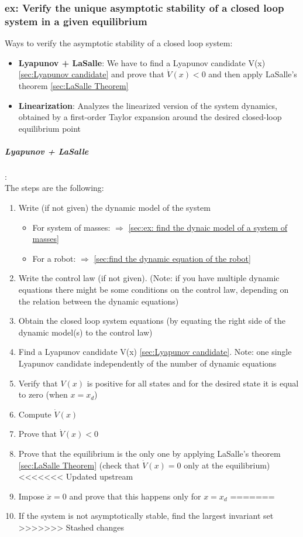 \documentclass[a4paper,12pt]{article}
\begin{document}
\subsubsection{ex: Verify the unique asymptotic stability of a closed loop
system in a given equilibrium}
Ways to verify the asymptotic stability of a
closed loop system:
\begin{itemize}
    \item \textbf{Lyapunov + LaSalle}: We have to find a Lyapunov
    candidate V(x) \ref{sec:Lyapunov candidate} and prove that $\dot{V}(x) < 0$ and then apply
    LaSalle's theorem \ref{sec:LaSalle Theorem}
    \item \textbf{Linearization}: Analyzes the linearized version of the system
    dynamics, obtained by a first-order Taylor expansion around the desired closed-loop equilibrium
    point
\end{itemize}
\subparagraph{Lyapunov + LaSalle}:\\
\label{sub:Lyapunov + LaSalle}
The steps are the following:
\begin{enumerate}
    \item Write (if not given) the dynamic model of the system 
    \begin{itemize}
        \item For system of masses: $\Rightarrow$ \ref{sec:ex: find the dynaic model of a system of masses}
        \item For a robot: $\Rightarrow$ \ref{sec:find the dynamic equation of the robot}
    \end{itemize}
    \item Write the control law (if not given). (Note: if you have multiple
    dynamic equations there might be some conditions on the control law, depending
    on the relation between the dynamic equations)
    \item Obtain the closed loop system equations (by 
    equating the right side of the dynamic model(s) to the control law)
    \item Find a Lyapunov candidate V(x) \ref{sec:Lyapunov candidate}. 
    Note: one single Lyapunov candidate independently of 
    the number of dynamic equations
    \item Verify that $V(x)$ is positive for all states and for 
    the desired state it is equal to zero (when $x = x_d$)
    \item Compute $\dot{V}(x)$
    \item Prove that $\dot{V}(x) < 0$
    \item Prove that the equilibrium is the only one by applying
     LaSalle's theorem \ref{sec:LaSalle Theorem} (check that 
     $\dot{V}(x) = 0$ only at the equilibrium)
<<<<<<< Updated upstream
    \item Impose $\ddot{x}=0$ and prove that this happens only for 
    $x=x_d$
=======
    \item If the system is not asymptotically stable, find the
    largest invariant set
>>>>>>> Stashed changes
\end{enumerate}
\end{document}

